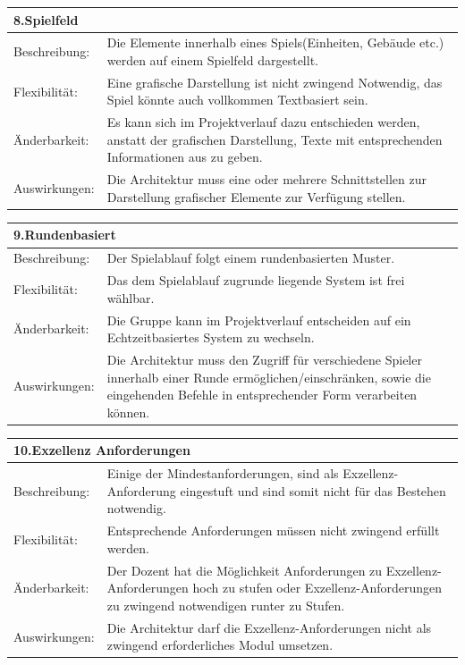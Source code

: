 \documentclass[fontsize=12pt,paper=a4,twoside]{scrartcl}
\begin{document}
\begin{tabular}{|p{3cm}|p{10cm}|}
	\hline
	\multicolumn{2}{|p{10cm}|}{\textbf{8.Spielfeld}}\\
	\hline
	Beschreibung:&Die Elemente innerhalb eines Spiels(Einheiten, Gebäude etc.) werden auf einem Spielfeld dargestellt.\\
	\hline
	Flexibilität:&Eine grafische Darstellung ist nicht zwingend Notwendig, das Spiel könnte auch vollkommen Textbasiert sein.\\
	\hline
	Änderbarkeit:&Es kann sich im Projektverlauf dazu entschieden werden, anstatt der grafischen Darstellung, Texte mit entsprechenden Informationen aus zu geben.\\
	\hline
	Auswirkungen:&Die Architektur muss eine oder mehrere Schnittstellen zur Darstellung grafischer Elemente zur Verfügung stellen.\\
	\hline
\end{tabular}

\begin{tabular}{|p{3cm}|p{10cm}|}
	\hline
	\multicolumn{2}{|p{10cm}|}{\textbf{9.Rundenbasiert}}\\
	\hline
	Beschreibung:&Der Spielablauf folgt einem rundenbasierten Muster.\\
	\hline
	Flexibilität:&Das dem Spielablauf zugrunde liegende System ist frei wählbar.\\
	\hline
	Änderbarkeit:&Die Gruppe kann im Projektverlauf entscheiden auf ein Echtzeitbasiertes System zu wechseln.\\
	\hline
	Auswirkungen:&Die Architektur muss den Zugriff für verschiedene Spieler innerhalb einer Runde ermöglichen/einschränken, sowie die eingehenden Befehle in entsprechender Form verarbeiten können.\\
	\hline
\end{tabular}

\begin{tabular}{|p{3cm}|p{10cm}|}
	\hline
	\multicolumn{2}{|p{10cm}|}{\textbf{10.Exzellenz Anforderungen}}\\
	\hline
	Beschreibung:&Einige der Mindestanforderungen, sind als Exzellenz-Anforderung eingestuft und sind somit nicht für das Bestehen notwendig.\\
	\hline
	Flexibilität:&Entsprechende Anforderungen müssen nicht zwingend erfüllt werden.\\
	\hline
	Änderbarkeit:&Der Dozent hat die Möglichkeit Anforderungen zu Exzellenz-Anforderungen hoch zu stufen oder Exzellenz-Anforderungen zu zwingend notwendigen runter zu Stufen.\\
	\hline
	Auswirkungen:&Die Architektur darf die Exzellenz-Anforderungen nicht als zwingend erforderliches Modul umsetzen.\\
	\hline
\end{tabular}
\end{document}
